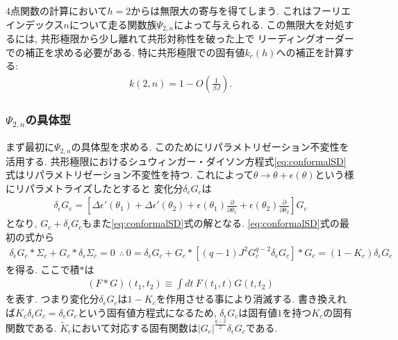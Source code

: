 4点関数の計算において$h = 2$からは無限大の寄与を得てしまう. 
これはフーリエインデックス$n$について走る関数族$\Psi_{2,n}$によって与えられる. 
この無限大を対処するには, 共形極限から少し離れて共形対称性を破った上で
リーディングオーダーでの補正を求める必要がある. 
特に共形極限での固有値$k_c(h)$への補正を計算する:
\begin{align}
	k(2, n) = 1 - O\left(\frac{1}{\beta J}\right).
\end{align}

\subsubsection{$\Psi_{2,n}$の具体型}
まず最初に$\Psi_{2,n}$の具体型を求める. 
このためにリパラメトリゼーション不変性を活用する. 
共形極限におけるシュウィンガー・ダイソン方程式\eqref{eq:conformalSD}式はリパラメトリゼーション不変性を持つ. 
これによって$\theta\to\theta + \epsilon(\theta)$という様にリパラメトライズしたとすると
変化分$\delta_{\epsilon}G_c$は
\begin{align}
	\delta_{\epsilon}G_c
	= \left[\Delta\epsilon'(\theta_1) + \Delta\epsilon'(\theta_2)
		+ \epsilon(\theta_1)\frac{\partial}{\partial{\theta_1}}
		+ \epsilon(\theta_2)\frac{\partial}{\partial{\theta_2}}
	\right]G_c
	\label{eq:reparameterization_fomula}
\end{align}
となり, $G_c + \delta_{\epsilon}G_c$もまた\eqref{eq:conformalSD}式の解となる. 
\eqref{eq:conformalSD}式の最初の式から
\begin{align}
	\delta_{\epsilon}G_c * \Sigma_c + G_c * \delta_{\epsilon}\Sigma_c = 0\hspace{5pt}
	\therefore\ 
	0 = \delta_{\epsilon}G_c + G_c * [(q-1)J^2G_c^{q-2}\delta_{\epsilon}G_c] * G_c
	= (1 - K_c)\delta_{\epsilon}G_c
	\label{eq:eigenfunc_of_Kc_is_reparametrization}
\end{align}
を得る. 
ここで積$*$は
\begin{align}
	(F*G)(t_1, t_2) \equiv \int dt\ F(t_1, t)G(t, t_2)
\end{align}
を表す. 
つまり変化分$\delta_{\epsilon}G_c$は$1 - K_c$を作用させる事により消滅する. 
書き換えれば$K_c\delta_{\epsilon}G_c = \delta_{\epsilon}G_c$という固有値方程式になるため, 
$\delta_{\epsilon}G_c$は固有値$1$を持つ$K_c$の固有関数である. 
$\tilde{K}_c$において対応する固有関数は$|G_c|^{\frac{q-2}{2}}\delta_{\epsilon}G_c$である. 

